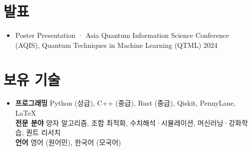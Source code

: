 \documentclass[letterpaper,11pt]{article}
\newcommand{\resumeItem}[1]{
  \item{
    {#1 \vspace{-4pt}}
  }
}
\newcommand{\resumeSubHeadingListStart}{\begin{itemize}[leftmargin=0.15in, label={}]}
\newcommand{\resumeSubHeadingListEnd}{\end{itemize}}
\begin{document}
\section{발표}
\resumeSubHeadingListStart
  \resumeItem{Poster Presentation · Asia Quantum Information Science Conference (AQIS), Quantum Techniques in Machine Learning (QTML) \hfill 2024}
\resumeSubHeadingListEnd

\section{보유 기술}
\begin{itemize}[leftmargin=0.15in, label={}]
    \item{
     \textbf{프로그래밍} \quad Python (상급), C++ (중급), Rust (중급), Qiskit, PennyLane, \LaTeX \\
     \textbf{전문 분야} \quad 양자 알고리즘, 조합 최적화, 수치해석·시뮬레이션, 머신러닝·강화학습, 퀀트 리서치 \\
     \textbf{언어} \quad 영어 (원어민), 한국어 (모국어)
    }
 \end{itemize}
\end{document}
